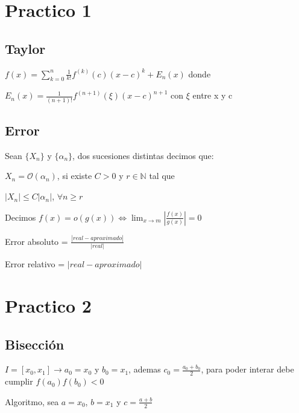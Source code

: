 \documentclass{article}
\begin{document}
\section{Practico 1}\label{Practico-1}


\subsection{Taylor}\label{Taylor}

$f(x) = \sum\limits_{k=0}^{n} \frac{1}{k!} f^{(k)}(c)(x-c)^k+E_n(x)$ donde

$E_n(x) = \frac{1}{(n+1)!} f^{(n+1)}(\xi)(x-c)^{n+1}$ con $\xi$ entre x y c

 \vspace{5mm}
\subsection{Error}\label{Error}

Sean $\{ X_n \}$ y $\{ \alpha_n \}$, dos sucesiones distintas decimos que:

$X_n = \mathcal{O}(\alpha_n)$, si existe $C > 0$ y $r \in \mathbb{N}$ tal que

$|X_n| \leq C|\alpha_n|$, $\forall n \geq r$

 \vspace{5mm}

Decimos $f(x) = o(g(x)) \Longleftrightarrow \lim_{x \to m} \left|\frac{f(x)}{g(x)} \right| = 0$
 \vspace{5mm}

 Error absoluto = $\frac{|real-aproximado|}{|real|}$

 Error relativo = $ |real - aproximado| $

  \vspace{5mm}

\section{Practico 2}\label{Practico-2}

\subsection{Bisección}\label{Biseccion}

$I = [x_0,x_1] \rightarrow a_0 = x_0$ y $b_0 = x_1$, ademas $c_0 =  \frac{a_0+b_0}{2}$, para poder interar debe cumplir
$f(a_0)f(b_0) < 0$

Algoritmo, sea $a = x_0$, $b = x_1$ y $c = \frac{a+b}{2}$
\end{document}

